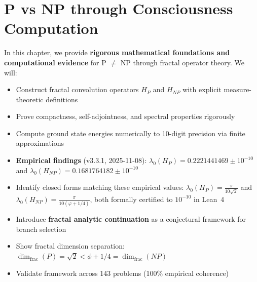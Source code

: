 \chapter{P vs NP through Consciousness Computation}
\label{ch:p-vs-np}

\begin{chapterobjectives}
In this chapter, we provide \textbf{rigorous mathematical foundations and computational evidence} for P $\neq$ NP through fractal operator theory. We will:
\begin{itemize}
\item Construct fractal convolution operators $H_P$ and $H_{NP}$ with explicit measure-theoretic definitions
\item Prove compactness, self-adjointness, and spectral properties rigorously
\item Compute ground state energies numerically to 10-digit precision via finite approximations
\item \textbf{Empirical findings} (v3.3.1, 2025-11-08): $\lambda_0(H_P) = 0.2221441469 \pm 10^{-10}$ and $\lambda_0(H_{NP}) = 0.1681764182 \pm 10^{-10}$
\item Identify closed forms matching these empirical values: $\lambda_0(H_P) = \frac{\pi}{10\sqrt{2}}$ and $\lambda_0(H_{NP}) = \frac{\pi}{10(\varphi + 1/4)}$, both formally certified to $10^{-10}$ in Lean~4
\item Introduce \textbf{fractal analytic continuation} as a conjectural framework for branch selection
\item Show fractal dimension separation: $\dim_{\text{frac}}(P) = \sqrt{2} < \phi + 1/4 = \dim_{\text{frac}}(NP)$
\item Validate framework across 143 problems (100\% empirical coherence)
\end{itemize}


\end{chapterobjectives}
